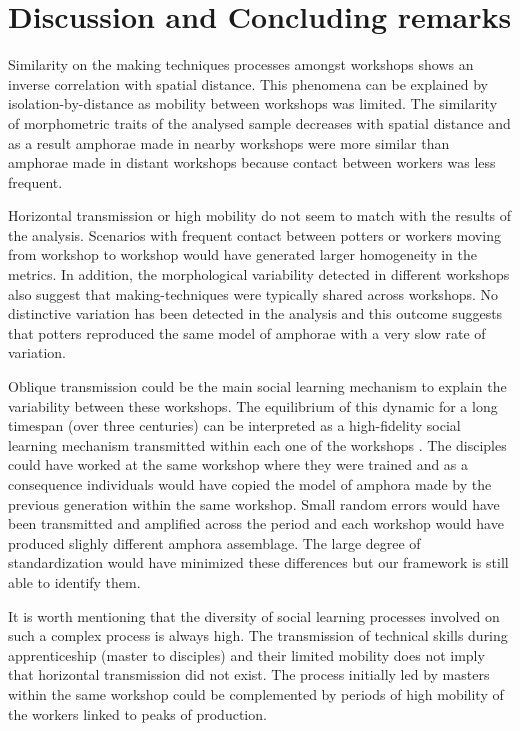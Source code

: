 \documentclass[review]{elsarticle}
\begin{document}
\section{Discussion and Concluding remarks}

Similarity on the making techniques processes amongst workshops shows an inverse correlation with spatial distance. This phenomena can be explained by isolation-by-distance as mobility between workshops was limited. The similarity of morphometric traits of the analysed sample decreases with spatial distance and as a result amphorae made in nearby workshops were more similar than amphorae made in distant workshops because contact between workers was less frequent. 

Horizontal transmission or high mobility do not seem to match with the results of the analysis. Scenarios with frequent contact between potters or workers moving from workshop to workshop would have generated larger homogeneity in the metrics. In addition, the morphological variability detected in different workshops also suggest that making-techniques were typically shared across workshops. No distinctive variation has been detected in the analysis and this outcome suggests that potters reproduced the same model of amphorae with a very slow rate of variation.
  
Oblique transmission could be the main social learning mechanism to explain the variability between these workshops. The equilibrium of this dynamic for a long timespan (over three centuries) can be interpreted as a high-fidelity social learning mechanism transmitted within each one of the workshops \citep{schillinger_copying_2016}. The disciples could have worked at the same workshop where they were trained and as a consequence individuals would have copied the model of amphora made by the previous generation within the same workshop. Small random errors would have been transmitted and amplified across the period and each workshop would have produced slighly different amphora assemblage. The large degree of standardization would have minimized these differences but our framework is still able to identify them.

It is worth mentioning that the diversity of social learning processes involved on such a complex process is always high. The transmission of technical skills during apprenticeship (master to disciples) and their limited mobility does not imply that horizontal transmission did not exist. The process initially led by masters within the same workshop could be complemented by periods of high mobility of the workers linked to peaks of production.
\end{document}
